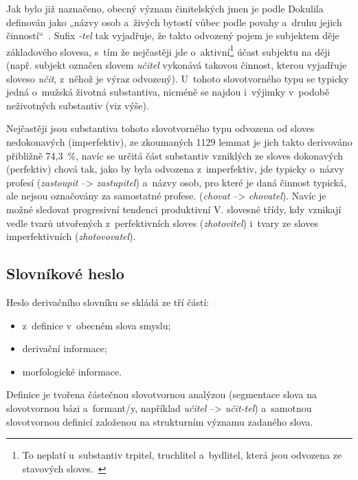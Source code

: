 Jak bylo již naznačeno, obecný význam činitelských jmen je podle
Dokulila definován jako „názvy osob a~živých bytostí vůbec podle povahy
a~druhu jejich činností``~\parencite[17]{dokulil67}. Sufix \emph{-tel}
tak vyjadřuje, že takto odvozený pojem je subjektem děje základového
slovesa, s~tím že nejčastěji jde
o~aktivní\footnote{To neplatí u~substantiv trpitel, truchlitel a~bydlitel, která jsou odvozena ze stavových sloves.~\parencite[17]{dokulil67}}
účast subjektu na ději (např. subjekt označen slovem \emph{učitel}
vykonává takovou činnost, kterou vyjadřuje sloveso \emph{učit}, z~něhož
je výraz odvozený). U~tohoto slovotvorného typu se typicky jedná
o~mužská životná substantiva, nicméně se najdou i~výjimky v~podobě
neživotných substantiv (viz výše).~\parencite{simandl2016}

Nejčastěji jsou substantiva tohoto slovotvorného typu odvozena od sloves
nedokonavých (imperfektiv), ze zkoumaných 1129 lemmat je jich takto
derivováno přibližně 74,3~\%, navíc se určitá část substantiv vzniklých
ze sloves dokonavých (perfektiv) chová tak, jako by byla odvozena
z~imperfektiv, jde typicky o~názvy profesí (\emph{zastoupit}
--\textgreater{} \emph{zastupitel}) a~názvy osob, pro které je daná
činnost typická, ale nejsou označovány za samostatné profese.
(\emph{chovat} --\textgreater{} \emph{chovatel}). Navíc je možné
sledovat progresivní tendenci produktivní V. slovesné třídy, kdy
vznikají vedle tvarů utvořených z~perfektivních sloves
(\emph{zhotovitel}) i~tvary ze sloves imperfektivních
(\emph{zhotovovatel}).~\parencite{adri}

\hypertarget{slovnuxedkovuxe9-heslo}{%
\subsection{Slovníkové heslo}\label{slovnuxedkovuxe9-heslo}}

Heslo derivačního slovníku se skládá ze tří částí:

\begin{itemize}
\tightlist
\item
  z~definice v~obecném slova smyslu;
\item
  derivační informace;
\item
  morfologické informace.
\end{itemize}

Definice je tvořena částečnou slovotvornou analýzou (segmentace slova na
slovotvornou bázi a~formant/y, například \emph{učitel} --\textgreater{}
\emph{učit-tel}) a~samotnou slovotvornou definicí založenou na
strukturním významu zadaného slova.


